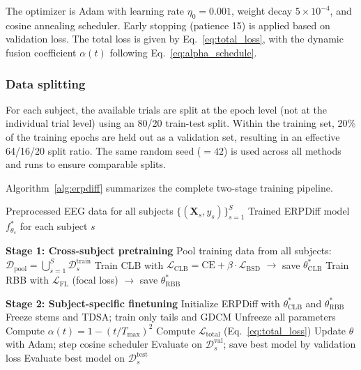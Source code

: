 The optimizer is Adam with learning rate $\eta_0 = 0.001$, weight decay $5 \times 10^{-4}$, and cosine annealing scheduler. Early stopping (patience 15) is applied based on validation loss. The total loss is given by Eq.~\eqref{eq:total_loss}, with the dynamic fusion coefficient $\alpha(t)$ following Eq.~\eqref{eq:alpha_schedule}.

\subsubsection{Data splitting}

For each subject, the available trials are split at the epoch level (not at the individual trial level) using an 80/20 train-test split. Within the training set, 20\% of the training epochs are held out as a validation set, resulting in an effective 64/16/20 split ratio. The same random seed ($= 42$) is used across all methods and runs to ensure comparable splits.

Algorithm~\ref{alg:erpdiff} summarizes the complete two-stage training pipeline.

\begin{algorithm}[t]
\caption{ERPDiff two-stage training pipeline.}
\label{alg:erpdiff}
\begin{algorithmic}[1]
\REQUIRE Preprocessed EEG data for all subjects $\{(\mathbf{X}_s, y_s)\}_{s=1}^{S}$
\ENSURE Trained ERPDiff model $f_{\theta_s}^*$ for each subject $s$

\STATE \textbf{Stage 1: Cross-subject pretraining}
\STATE Pool training data from all subjects: $\mathcal{D}_{\text{pool}} = \bigcup_{s=1}^{S} \mathcal{D}_s^{\text{train}}$
\STATE Train CLB with $\mathcal{L}_{\text{CLB}} = \text{CE} + \beta \cdot \mathcal{L}_{\text{BSD}}$ $\rightarrow$ save $\theta_{\text{CLB}}^*$
\STATE Train RBB with $\mathcal{L}_{\text{FL}}$ (focal loss) $\rightarrow$ save $\theta_{\text{RBB}}^*$

\STATE \textbf{Stage 2: Subject-specific finetuning}
    \STATE Initialize ERPDiff with $\theta_{\text{CLB}}^*$ and $\theta_{\text{RBB}}^*$
    \STATE Freeze stems and TDSA; train only tails and GDCM
            \STATE Unfreeze all parameters 
        \ENDIF
        \STATE Compute $\alpha(t) = 1 - (t / T_{\max})^2$
        \STATE Compute $\mathcal{L}_{\text{total}}$ (Eq.~\ref{eq:total_loss})
        \STATE Update $\theta$ with Adam; step cosine scheduler
        \STATE Evaluate on $\mathcal{D}_s^{\text{val}}$; save best model by validation loss
    \ENDFOR
    \STATE Evaluate best model on $\mathcal{D}_s^{\text{test}}$
\ENDFOR
\end{algorithmic}
\end{algorithm}
